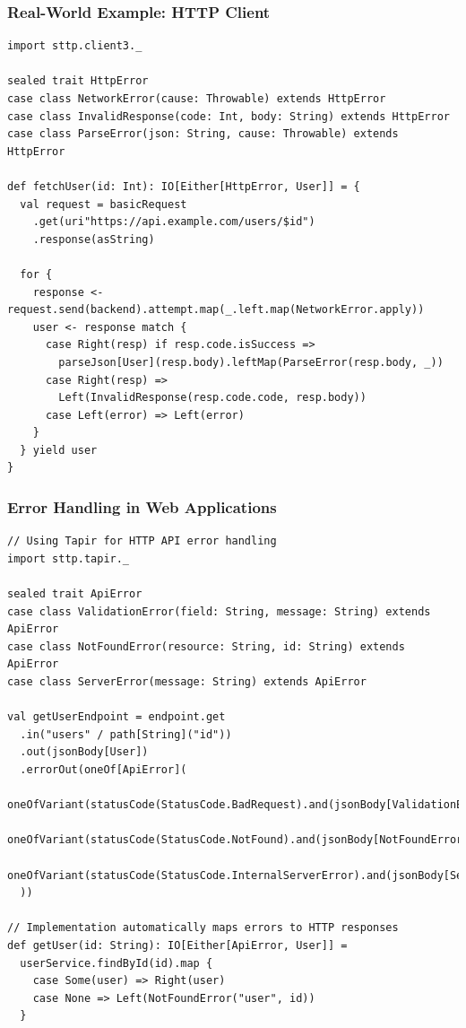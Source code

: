 \documentclass{beamer}
\begin{document}
\begin{frame}[fragile]
\frametitle{Real-World Example: HTTP Client}

\begin{lstlisting}[style=scalaStyle]
import sttp.client3._

sealed trait HttpError
case class NetworkError(cause: Throwable) extends HttpError
case class InvalidResponse(code: Int, body: String) extends HttpError
case class ParseError(json: String, cause: Throwable) extends HttpError

def fetchUser(id: Int): IO[Either[HttpError, User]] = {
  val request = basicRequest
    .get(uri"https://api.example.com/users/$id")
    .response(asString)
  
  for {
    response <- request.send(backend).attempt.map(_.left.map(NetworkError.apply))
    user <- response match {
      case Right(resp) if resp.code.isSuccess => 
        parseJson[User](resp.body).leftMap(ParseError(resp.body, _))
      case Right(resp) => 
        Left(InvalidResponse(resp.code.code, resp.body))
      case Left(error) => Left(error)
    }
  } yield user
}
\end{lstlisting}

\end{frame}

\begin{frame}[fragile]
\frametitle{Error Handling in Web Applications}

\begin{lstlisting}[style=scalaStyle]
// Using Tapir for HTTP API error handling
import sttp.tapir._

sealed trait ApiError
case class ValidationError(field: String, message: String) extends ApiError
case class NotFoundError(resource: String, id: String) extends ApiError
case class ServerError(message: String) extends ApiError

val getUserEndpoint = endpoint.get
  .in("users" / path[String]("id"))
  .out(jsonBody[User])
  .errorOut(oneOf[ApiError](
    oneOfVariant(statusCode(StatusCode.BadRequest).and(jsonBody[ValidationError])),
    oneOfVariant(statusCode(StatusCode.NotFound).and(jsonBody[NotFoundError])),
    oneOfVariant(statusCode(StatusCode.InternalServerError).and(jsonBody[ServerError]))
  ))

// Implementation automatically maps errors to HTTP responses
def getUser(id: String): IO[Either[ApiError, User]] = 
  userService.findById(id).map {
    case Some(user) => Right(user)
    case None => Left(NotFoundError("user", id))
  }
\end{lstlisting}

\end{frame}
\end{document}
